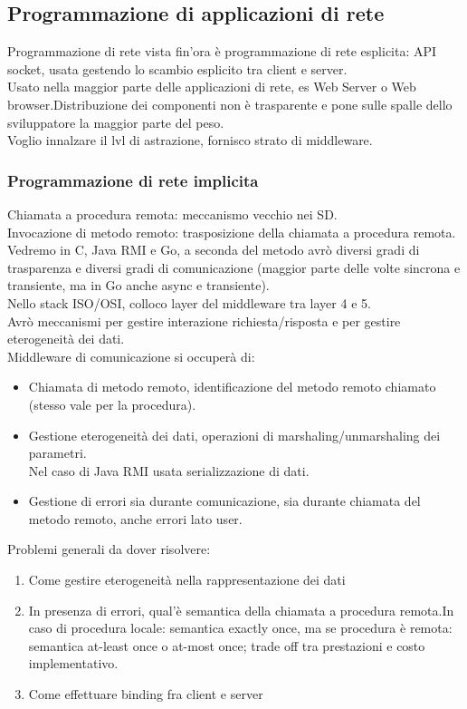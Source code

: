 \documentclass[16px]{article}
\begin{document}
\subsection{Programmazione di applicazioni di rete}
Programmazione di rete vista fin'ora è programmazione di rete esplicita: API socket, usata gestendo lo scambio esplicito tra client e server.\\Usato nella maggior parte delle applicazioni di rete, es Web Server o Web browser.Distribuzione dei componenti non è trasparente e pone sulle spalle dello sviluppatore la maggior parte del peso.\\Voglio innalzare il lvl di astrazione, fornisco strato di middleware.
\subsubsection{Programmazione di rete implicita}
Chiamata a procedura remota: meccanismo vecchio nei SD.\\
Invocazione di metodo remoto: trasposizione della chiamata a procedura remota.\\
Vedremo in C, Java RMI e Go, a seconda del metodo avrò diversi gradi di trasparenza e diversi gradi di comunicazione (maggior parte delle volte sincrona e transiente, ma in Go anche async e transiente).\\Nello stack ISO/OSI, colloco layer del middleware tra layer 4 e 5.\\ Avrò meccanismi per gestire interazione richiesta/risposta e per gestire eterogeneità dei dati.\\
Middleware di comunicazione si occuperà di:
\begin{itemize}
\item Chiamata di metodo remoto, identificazione del metodo remoto chiamato (stesso vale per la procedura).
\item Gestione eterogeneità dei dati, operazioni di marshaling/unmarshaling dei parametri.\\ Nel caso di Java RMI usata serializzazione di dati.
\item Gestione di errori sia durante comunicazione, sia durante chiamata del metodo remoto, anche errori lato user.
\end{itemize}
Problemi generali da dover risolvere:
\begin{enumerate}
\item Come gestire eterogeneità nella rappresentazione dei dati
\item In presenza di errori, qual'è semantica della chiamata a procedura remota.In caso di procedura locale: semantica exactly once, ma se procedura è remota: semantica at-least once o at-most once; trade off tra prestazioni e costo implementativo.
\item Come effettuare binding fra client e server
\end{enumerate}
\end{document}
